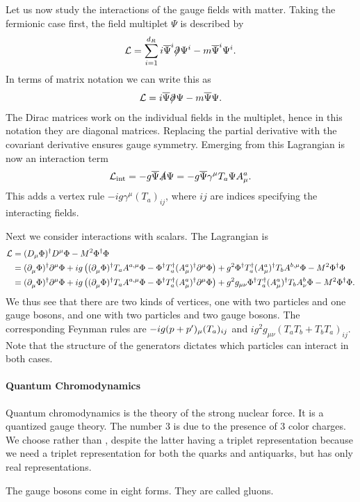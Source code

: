 Let us now study the interactions of the gauge fields with matter. Taking the fermionic case first, the field multiplet $\Psi$ is described by
\begin{align*}
	\mathcal{L} = \sum\limits_{i = 1}^{d_{R}}i\overline{\Psi}^{i}\slashed{\partial^{}_{}}\Psi^{i} - m\overline{\Psi}^{i}\Psi^{i}.
\end{align*}
In terms of matrix notation we can write this as
\begin{align*}
	\mathcal{L} = i\overline{\Psi}\slashed{\partial^{}_{}}\Psi - m\overline{\Psi}\Psi.
\end{align*}
The Dirac matrices work on the individual fields in the multiplet, hence in this notation they are diagonal matrices. Replacing the partial derivative with the covariant derivative ensures gauge symmetry. Emerging from this Lagrangian is now an interaction term
\begin{align*}
	\mathcal{L}_{\text{int}} = -g\overline{\Psi}\slashed{A}\Psi = -g\overline{\Psi}\gamma^{\mu}T_{a}\Psi A_{\mu}^{a}.
\end{align*}
This adds a vertex rule $-ig\gamma^{\mu}(T_{a})_{ij}$, where $ij$ are indices specifying the interacting fields.

Next we consider interactions with scalars. The Lagrangian is
\begin{align*}
	\mathcal{L} &= (D_{\mu}\Phi)^{\dagger} D^{\mu}\Phi - M^{2}\Phi^{\dagger}\Phi \\
	     &= (\partial^{}_{\mu}\Phi)^{\dagger} \partial^{\mu}_{}\Phi + ig\left((\partial^{}_{\mu}\Phi)^{\dagger} T_{a}A^{a, \mu}\Phi - \Phi^{\dagger} T_{a}^{\dagger} (A_{\mu}^{a})^{\dagger}\partial^{\mu}_{}\Phi\right) + g^{2}\Phi^{\dagger} T_{a}^{\dagger} (A_{\mu}^{a})^{\dagger} T_{b}A^{b, \mu}\Phi - M^{2}\Phi^{\dagger}\Phi \\
	     &= (\partial^{}_{\mu}\Phi)^{\dagger} \partial^{\mu}_{}\Phi + ig\left((\partial^{}_{\mu}\Phi)^{\dagger} T_{a}A^{a, \mu}\Phi - \Phi^{\dagger} T_{a}^{\dagger} (A_{\mu}^{a})^{\dagger}\partial^{\mu}_{}\Phi\right) + g^{2}g_{\mu\nu}\Phi^{\dagger} T_{a}^{\dagger} (A_{\mu}^{a})^{\dagger} T_{b}A_{\nu}^{b}\Phi - M^{2}\Phi^{\dagger}\Phi.
\end{align*}
We thus see that there are two kinds of vertices, one with two particles and one gauge bosons, and one with two particles and two gauge bosons. The corresponding Feynman rules are $-ig(p + p^{\prime})_{\mu}(T_{a})_{ij}$ and $ig^{2}g_{\mu\nu}(T_{a}T_{b} + T_{b}T_{a})_{ij}$. Note that the structure of the generators dictates which particles can interact in both cases.

\paragraph{Quantum Chromodynamics}
Quantum chromodynamics is the theory of the strong nuclear force. It is a quantized  gauge theory. The number 3 is due to the presence of 3 color charges. We choose  rather than , despite the latter having a triplet representation because we need a triplet representation for both the quarks and antiquarks, but  has only real representations.

The gauge bosons come in eight forms. They are called gluons.